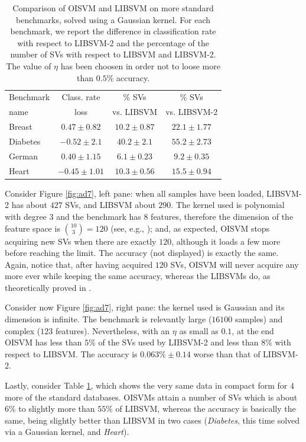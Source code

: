 \begin{table}
\begin{center}
\begin{tabular}[!h]{|l|c|c|c|}
\hline
  Benchmark & Class. rate    & \% SVs          & \% SVs        \\
       name & loss           & vs. LIBSVM      & vs. LIBSVM-2  \\ \hline
     Breast & $0.47\pm0.82$  & $10.2\pm0.87$   & $22.1\pm1.77$ \\
   Diabetes & $-0.52\pm2.1$  & $40.2\pm2.1$    & $55.2\pm2.73$ \\
   German   & $0.40\pm1.15$  & $6.1\pm0.23$    & $9.2\pm0.35$  \\
   Heart    & $-0.45\pm1.01$ & $10.3\pm0.56$   & $15.5\pm0.94$ \\ \hline
\end{tabular}
\end{center}
\label{table:t1}
\caption{Comparison of OISVM and LIBSVM on more standard benchmarks, solved
 using a Gaussian kernel. For each benchmark, we report the difference
 in classification rate with respect to LIBSVM-2 and the
 percentage of the number of SVs with respect to LIBSVM and
 LIBSVM-2. The value of $\eta$ has been choosen in order not to loose
 more than $0.5\%$ accuracy.}
\end{table}

Consider Figure \ref{fig:ad7}, left pane: when all samples have been
loaded, LIBSVM-2 has about $427$ SVs, and LIBSVM about $290$. The
kernel used is polynomial with degree $3$ and the benchmark has $8$
features, therefore the dimension of the feature space is
$\binom{10}{3} = 120$ (see, e.g., \cite{Burges98}); and, as expected,
OISVM stops acquiring new SVs when there are exactly $120$, although
it loads a few more before reaching the limit. The accuracy (not
displayed) is exactly the same. Again, notice that, after having
acquired $120$ SVs, OISVM will never acquire any more ever while
keeping the same accuracy, whereas the LIBSVMs do, as theoretically
proved in \cite{Steinwart03}.

Consider now Figure \ref{fig:ad7}, right pane: the kernel used is
Gaussian and its dimension is infinite. The benchmark is relevantly
large ($16100$ samples) and complex ($123$ features). Nevertheless,
with an $\eta$ as small as $0.1$, at the end OISVM has less than $5\%$
of the SVs used by LIBSVM-2 and less than $8\%$ with respect to
LIBSVM. The accuracy is $0.063\%\pm0.14$ worse than that of LIBSVM-2.

Lastly, consider Table \ref{table:t1}, which shows the very same data
in compact form for $4$ more of the standard databases. OISVMs attain
a number of SVs which is about $6\%$ to slightly more than $55\%$ of
LIBSVM, whereas the accuracy is basically the same, being slightly
better than LIBSVM in two cases (\emph{Diabetes}, this time solved via
a Gaussian kernel, and \emph{Heart}).
